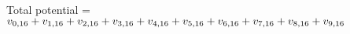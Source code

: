\documentclass[preview]{standalone}
\begin{document}
\begin{center}
Total potential = $v_{0,16} + \\v_{1,16} + \\v_{2,16} + \\v_{3,16} + \\v_{4,16} + \\v_{5,16} + \\v_{6,16} + \\v_{7,16} + \\v_{8,16} + \\v_{9,16}$
\end{center}
\end{document}
